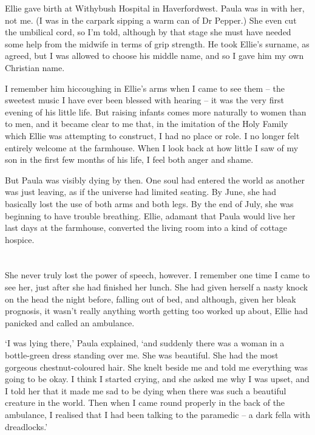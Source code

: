 Ellie gave birth at Withybush Hospital in Haverfordwest. Paula was in with her, not me. (I was in the carpark sipping a warm can of Dr Pepper.) She even cut the umbilical cord, so I'm told, although by that stage she must have needed some help from the midwife in terms of grip strength. He took Ellie's surname, as agreed, but I was allowed to choose his middle name, and so I gave him my own Christian name.

I remember him hiccoughing in Ellie's arms when I came to see them -- the sweetest music I have ever been blessed with hearing -- it was the very first evening of his little life. But raising infants comes more naturally to women than to men, and it became clear to me that, in the imitation of the Holy Family which Ellie was attempting to construct, I had no place or role. I no longer felt entirely welcome at the farmhouse. When I look back at how little I saw of my son in the first few months of his life, I feel both anger and shame.

But Paula was visibly dying by then. One soul had entered the world as another was just leaving, as if the universe had limited seating. By June, she had basically lost the use of both arms and both legs. By the end of July, she was beginning to have trouble breathing. Ellie, adamant that Paula would live her last days at the farmhouse, converted the living room into a kind of cottage hospice.

\section{}

She never truly lost the power of speech, however. I remember one time I came to see her, just after she had finished her lunch. She had given herself a nasty knock on the head the night before, falling out of bed, and although, given her bleak prognosis, it wasn't really anything worth getting too worked up about, Ellie had panicked and called an ambulance.

`I was lying there,' Paula explained, `and suddenly there was a woman in a bottle-green dress standing over me. She was beautiful. She had the most gorgeous chestnut-coloured hair. She knelt beside me and told me everything was going to be okay. I think I started crying, and she asked me why I was upset, and I told her that it made me sad to be dying when there was such a beautiful creature in the world. Then when I came round properly in the back of the ambulance, I realised that I had been talking to the paramedic -- a dark fella with dreadlocks.'


